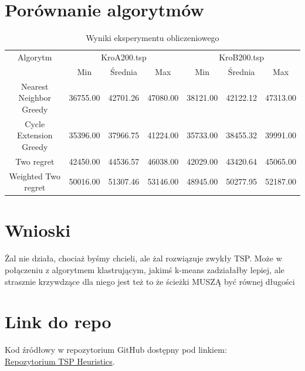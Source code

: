 \documentclass[11pt]{article}
\begin{document}
\section{Porównanie algorytmów}\label{sec:porównanie-algorytmów}
\begin{table}[H]
    \centering
    \begin{tabular}{|c||c|c|c||c|c|c|}
        \hline
        Algorytm & \multicolumn{3}{c||}{KroA200.tsp} & \multicolumn{3}{c|}{KroB200.tsp} \\
        \cline{2-4} \cline{5-7}
        & Min & Średnia & Max & Min & Średnia & Max   \\
        \hline
        Nearest Neighbor Greedy & 36755.00 & 42701.26 & 47080.00 & 38121.00 & 42122.12 & 47313.00 \\
        \hline
        Cycle Extension Greedy & 35396.00 & 37966.75 & 41224.00 & 35733.00 & 38455.32 &  39991.00 \\
        \hline
        Two regret & 42450.00 & 44536.57 & 46038.00 & 42029.00 & 43420.64 & 45065.00 \\
        \hline
        Weighted Two regret & 50016.00 & 51307.46 & 53146.00 & 48945.00 & 50277.95 & 52187.00 \\
        \hline
    \end{tabular}
    \label{tab:wyniki-eksperymentu}
    \caption{Wyniki eksperymentu obliczeniowego}
\end{table}

\section{Wnioski}\label{sec:wnioski}

Żal nie działa, chociaż byśmy chcieli, ale żal rozwiązuje zwykły TSP.
Może w połączeniu z algorytmem klastrującym, jakimś k-means zadziałałby lepiej, ale strasznie krzywdzące dla niego jest też to że ścieżki MUSZĄ być równej długości

\section{Link do repo}\label{sec:link-do-repo}
Kod źródłowy w repozytorium GitHub dostępny pod linkiem: \\
\href{https://github.com/KotZPolibudy/PUT_IMO/tree/main/TSP_heuristic}{Repozytorium TSP Heuristics}.
\end{document}
